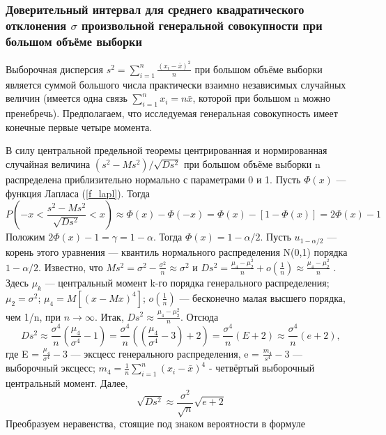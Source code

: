\documentclass[12pt]{article}
\begin{document}
	\subsubsection{Доверительный интервал для среднего квадратического отклонения $\sigma$ произвольной генеральной совокупности при большом объёме выборки}
	Выборочная дисперсия $s^{2} = \sum_{i = 1}^{n}{\frac{(x_{i} - \bar{x})^{2}}{n}}$ при большом объёме выборки является суммой большого числа практически взаимно независимых случайных величин (имеется одна связь $\sum_{i=1}^{n}{x_{i}} = n\bar{x}$, которой при большом n можно пренебречь). Предполагаем, что исследуемая генеральная совокупность имеет конечные первые четыре момента.

	В силу центральной предельной теоремы центрированная и нормированная случайная величина $(s^{2}-Ms^{2})/\sqrt{D s^{2}}$ при большом объёме выборки n распределена приблизительно нормально с параметрами 0 и 1. Пусть $\Phi(x)$ — функция Лапласа (\ref{f_lapl}). Тогда
	\begin{equation}
		P\left(-x < \frac{s^{2}-Ms^{2}}{\sqrt{D s^{2}}} < x\right)
		\approx \Phi(x) - \Phi(-x)=\Phi(x) - [1 - \Phi(x)] = 2\Phi(x) - 1
		\label{P_as_sigma}
	\end{equation}
	 Положим $2\Phi(x)-1 = \gamma = 1-\alpha$. Тогда $\Phi(x) = 1-\alpha/2$. Пусть $u_{1-\alpha/2}$ — корень этого уравнения — квантиль нормального распределения N(0,1) порядка $1-\alpha/2$. Известно, что $Ms^{2} = \sigma^{2} -\frac{\sigma^{2}}{n} \approx \sigma^{2} \text{ и } D s^{2} = \frac{\mu_{4} -\mu_{2}^{2}}{n} + o(\frac{1}{n}) \approx \frac{\mu_{4} -\mu_{2}^{2}}{n}$ . Здесь $\mu_{k}$ — центральный момент k-го порядка генерального распределения; $\mu_{2} = \sigma^2$; $\mu_4 = M[(x-Mx)^4]$; $o(\frac{1}{n})$ — бесконечно малая высшего порядка, чем 1/n, при $n\rightarrow \infty$. Итак, $D s^{2} \approx \frac{\mu_{4} -\mu_{2}^{2}}{n}$. Отсюда
	\begin{equation}
		D s^{2} \approx \frac{\sigma^{4}}{n}(\frac{\mu_{4}}{\sigma^{4}} - 1) = 
		\frac{\sigma^{4}}{n}((\frac{\mu_{4}}{\sigma^{4}} - 3) + 2) = \frac{\sigma^{4}}{n}(E + 2) \approx \frac{\sigma^{4}}{n}(e + 2),
		\label{Ds_2}
	\end{equation}
	где E = $\frac{\mu_{4}}{\sigma^{4}} - 3$ — эксцесс генерального распределения, e = $\frac{m_{4}}{s^{4}} - 3$ — выборочный эксцесс; $m_{4} = \frac{1}{n}\sum_{i =1}^{n}{(x_{i} - \bar{x})^{4}}$  - четвёртый выборочный центральный момент. Далее,
	\begin{equation}
		\sqrt{D s^{2}} \approx \frac{\sigma^{2}}{\sqrt{n}}\sqrt{e + 2}
		\label{sqrt_Ds}
	\end{equation}
	Преобразуем неравенства, стоящие под знаком вероятности в формуле
\end{document}
